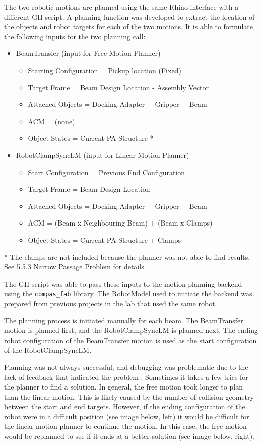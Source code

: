 The two robotic motions are planned using the same Rhino interface with a different GH script. A planning function was developed to extract the location of the objects and robot targets for each of the two motions. It is able to formulate the following inputs for the two planning call:
\begin{itemize}
    \item BeamTransfer (input for Free Motion Planner)
    \begin{itemize}
        \item Starting Configuration = Pickup location (Fixed)
        \item Target Frame = Beam Design Location - Assembly Vector
        \item Attached Objects = Docking Adapter + Gripper + Beam
        \item ACM = (none)
        \item Object States = Current PA Structure *
    \end{itemize}
    \item RobotClampSyncLM (input for Linear Motion Planner)
    \begin{itemize}
        \item Start Configuration = Previous End Configuration
        \item Target Frame = Beam Design Location
        \item Attached Objects = Docking Adapter + Gripper + Beam
        \item ACM = (Beam x Neighbouring Beam) + (Beam x Clamps)
        \item Object States = Current PA Structure + Clamps
    \end{itemize}
\end{itemize}
* The clamps are not included because the planner was not able to find results. See 5.5.3 Narrow Passage Problem for details.

The GH script was able to pass these inputs to the motion planning backend using the \verb|compas_fab| library. The RobotModel used to initiate the backend was prepared from previous projects in the lab that used the same robot. 

The planning process is initiated manually for each beam. The BeamTransfer motion is planned first, and the RobotClampSyncLM is planned next. The ending robot configuration of the BeamTransfer motion is used as the start configuration of the RobotClampSyncLM.

Planning was not always successful, and debugging was problematic due to the lack of feedback that indicated the problem . Sometimes it takes a few tries for the planner to find a solution. In general, the free motion took longer to plan than the linear motion. This is likely caused by the number of collision geometry between the start and end targets. However, if the ending configuration of the robot were in a difficult position (see image below, left) it would be difficult for the linear motion planner to continue the motion. In this case, the free motion would be replanned to see if it ends at a better solution (see image below, right).

